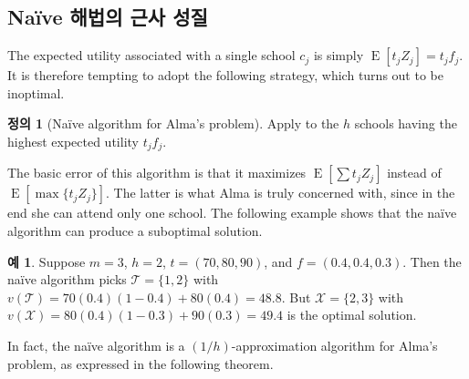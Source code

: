 \documentclass[12pt]{article} %
\newif\ifen
\theoremstyle{definition}
\newtheorem{example}{Example}
\newtheorem{definition}{Definition}
\theoremstyle{definition}
\newtheorem{example}{예}
\newtheorem{definition}{정의}
\begin{document}
\ifen \subsection{Approximation properties of a na\"ive solution}  \else \subsection{Na\"ive 해법의 근사 성질} \fi
The expected utility associated with a single school $c_j$ is simply $\operatorname{E}[t_j Z_j] = t_j f_j$. It is therefore tempting to adopt the following strategy, which turns out to be inoptimal.
\begin{definition}[Na\"ive algorithm for Alma’s problem] \label{naivealgorithm}
Apply to the $h$ schools having the highest expected utility $t_j f_j$.
\end{definition}
The basic error of this algorithm is that it maximizes $\operatorname{E}\left[\sum t_j Z_j \right]$ instead of $\operatorname{E}\left[\max \{t_j Z_j\} \right]$. The latter is what Alma is truly concerned with, since in the end she can attend only one school. The following example shows that the na\"ive algorithm can produce a suboptimal solution.
\begin{example}
Suppose $m=3$, $h=2$,  $ t= (70, 80, 90) $, and $f = (0.4, 0.4, 0.3)$. 
Then the na\"ive algorithm picks $\mathcal{T} = \{1, 2\}$ with 
$v(\mathcal{T}) = 70(0.4)(1-0.4) + 80(0.4) = 48.8$.
But $\mathcal{X} = \{2, 3\}$ with
$v(\mathcal{X}) = 80(0.4)(1-0.3) + 90(0.3) = 49.4$
is the optimal solution. 
\end{example}

In fact, the na\"ive algorithm is a $(1/h)$-approximation algorithm for Alma’s problem, as expressed in the following theorem.
\end{document}
